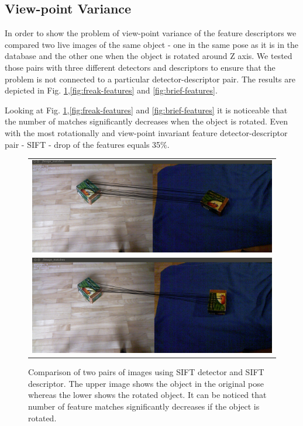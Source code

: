 \subsection{View-point Variance}

In order to show the problem of view-point variance of the feature descriptors we compared two live images of the same object - one in the same pose as it is in the database and the other one when the object is rotated around Z axis. We tested those pairs with three different detectors and descriptors to ensure that the problem is not connected to a particular detector-descriptor pair. The results are depicted in Fig. \ref{fig:sift-features},\ref{fig:freak-features} and \ref{fig:brief-features}.

Looking at Fig. \ref{fig:sift-features},\ref{fig:freak-features} and \ref{fig:brief-features} it is noticeable that the number of matches significantly decreases when the object is rotated. Even with the most rotationally and view-point invariant feature detector-descriptor pair - SIFT - drop of the features equals 35$\%$.

\begin{figure}
    \begin{tabular}{c}
 

\includegraphics[width=0.7\columnwidth]{figures/sift-gpu-no-rotation.png}\\
\includegraphics[width=0.7\columnwidth]{figures/siftgpu-rotation.png}\\
    \end{tabular}


\caption{Comparison of two pairs of images using SIFT detector and SIFT descriptor. The upper image shows the object in the original pose whereas the lower shows the rotated object. It can be noticed that number of feature matches significantly decreases if the object is rotated. }
\label{fig:sift-features}
\end{figure}

